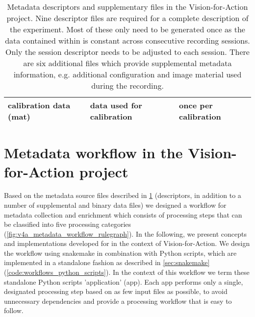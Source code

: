 \begin{table}[]
\begin{tabular}{lll}
\multicolumn{1}{l}{calibration data (mat)}       & \multicolumn{1}{l}{data used for calibration}                                                                         & \multicolumn{1}{l}{once per calibration}                                            \\ \hline
\end{tabular}
\caption[Metadata files in the Vision-for-Action project]{Metadata descriptors and supplementary files in the Vision-for-Action project. Nine  descriptor files are required for a complete description of the experiment. Most of these only need to be generated once as the data contained within is constant across consecutive recording sessions. Only the session descriptor needs to be adjusted to each session. There are six additional files which provide supplemental metadata information, e.g. additional configuration and image material used during the recording.}
\label{tab:v4a_metadata_files}
\end{table}

\section{Metadata workflow in the Vision-for-Action project}

Based on the metadata source files described in \cref{tab:v4a_metadata_files} (descriptors, in addition to a number of supplemental and binary data files) we designed a workflow for metadata collection and enrichment which consists of processing steps that can be classified into five processing categories (\cref{fig:v4a_metadata_workflow_rulegraph}). In the following, we present concepts and implementations developed for in the context of Vision-for-Action. We design the workflow using snakemake in combination with Python scripts, which are implemented in a standalone fashion as described in \cref{sec:snakemake} (\cref{code:workflows_python_scripts}). In the context of this workflow we term these standalone Python scripts 'application' (app). Each app performs only a single, designated processing step based on as few input files as possible, to avoid unnecessary dependencies and provide a processing workflow that is easy to follow.

